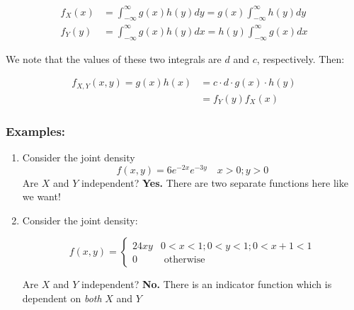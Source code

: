 \documentclass{article}
\begin{document}
\begin{equation*}
    \begin{split}
        f_X(x) &= \int_{-\infty}^\infty g(x)h(y)dy = g(x) \int_{-\infty}^\infty h(y) dy\\
        f_Y(y) &= \int_{-\infty}^\infty g(x) h(y) dx = h(y) \int_{-\infty}^\infty g(x) dx
    \end{split}
\end{equation*}

We note that the values of these two integrals are $d$ and $c$, respectively. Then:

\begin{equation*}
    \begin{split}
        f_{X,Y}(x,y) = g(x) h(x) &= c\cdot d \cdot g(x) \cdot h(y)\\
        &= f_Y(y) f_X(x)
    \end{split}
\end{equation*}

\subsubsection*{Examples:}
\begin{enumerate}
    \item Consider the joint density
    \begin{equation*}
        f(x,y) = 6 e^{-2x} e^{-3y} \quad x>0; y>0
    \end{equation*}
    Are $X$ and $Y$ independent? \textbf{Yes.} There are two separate functions here like we want!

    \item Consider the joint density:

    \begin{equation*}
        f(x,y) = \begin{cases}
            24xy & 0<x<1; 0<y<1; 0 < x+1<1\\
            0 & \text{ otherwise}
        \end{cases}
    \end{equation*}

    Are $X$ and $Y$ independent? \textbf{No.} There is an indicator function which is dependent on \textit{both} $X$ and $Y$

\end{enumerate}
\end{document}
